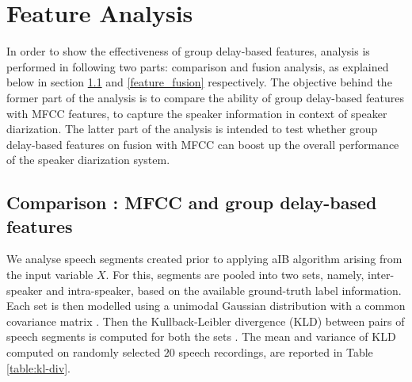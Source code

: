 \documentclass[conference]{IEEEtran}
\begin{document}

\section{Feature Analysis}
\label{feature_analysis_and_fusion}
In order to show the effectiveness of group delay-based features, analysis is
performed in following two parts: comparison and fusion analysis, as explained
below in section \ref{feature_analysis} and \ref{feature_fusion} respectively.
The objective behind the former part of the analysis is to compare the ability
of group delay-based features with MFCC features, to capture the speaker
information in context of speaker diarization. The latter part of the
analysis is intended to test whether group delay-based features on fusion with
MFCC can boost up the overall performance of the speaker diarization system. 
 
\subsection{Comparison : MFCC and group delay-based features}
\label{feature_analysis}

We analyse speech segments created prior to applying aIB algorithm arising from
the input variable $X$.  For this, segments are pooled into two sets, 
namely, inter-speaker and intra-speaker, based on the available ground-truth 
label information. Each set is then modelled using a unimodal Gaussian
distribution with a common covariance matrix \cite{featFilterBank}. 
Then the Kullback-Leibler divergence (KLD) between pairs of 
speech segments is computed for both the
sets \cite{kld}. The mean and variance of KLD computed on randomly selected $20$
speech recordings, are reported in Table \ref{table:kl-div}. 
\end{document}
